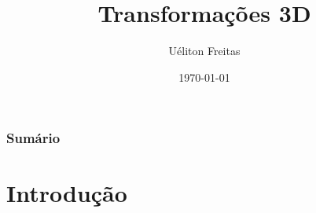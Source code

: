 \documentclass{beamer}
\title[Computação Gráfica]{Transformações 3D} %
\author{Uéliton Freitas} %
\institute[UFMS] %
{
Universidade Católica Don Bosco - UCDB \\ %
\medskip
\textit{freitas.ueliton@gmail.com} %
}
\date{\today} %
\begin{document}
\begin{frame}
\titlepage %
\end{frame}

\begin{frame}
\frametitle{Sumário} %
\tableofcontents %
\end{frame}





\section{Introdução} 

\end{document}
